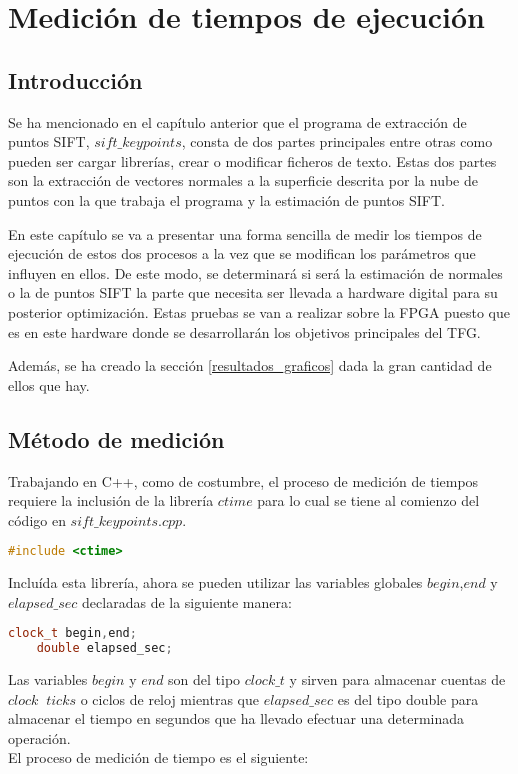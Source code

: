 \chapter{Medición de tiempos de ejecución}

\section{Introducción}
Se ha mencionado en el capítulo anterior que el programa de extracción de puntos SIFT, $sift\_keypoints$, consta de dos partes principales entre otras como pueden ser cargar librerías, crear o modificar ficheros de texto. Estas dos partes son la extracción de vectores normales a la superficie descrita por la nube de puntos con la que trabaja el programa y la estimación de puntos SIFT.


En este capítulo se va a presentar una forma sencilla de medir los tiempos de ejecución de estos dos procesos a la vez que se modifican los parámetros que influyen en ellos. De este modo, se determinará si será la estimación de normales o la de puntos SIFT la parte que necesita ser llevada a hardware digital para su posterior optimización. Estas pruebas se van a realizar sobre la FPGA puesto que es en este hardware donde se desarrollarán los objetivos principales del TFG.

Además, se ha creado la sección \ref{resultados_graficos} dada la gran cantidad de ellos que hay.


\section{Método de medición}
Trabajando en C++, como de costumbre, el proceso de medición de tiempos requiere la inclusión de la librería $ctime$\cite{ctime} para lo cual se tiene al comienzo del código en $sift\_keypoints.cpp$.

\begin{lstlisting}[language=C++,breaklines]
	#include <ctime>
\end{lstlisting}

Incluída esta librería, ahora se pueden utilizar las variables globales $begin$,$end$ y $elapsed\_sec$ declaradas de la siguiente manera:

\begin{lstlisting}[language=C++,breaklines]
	clock_t begin,end;
	double elapsed_sec;
\end{lstlisting}

Las variables $begin$ y $end$ son del tipo $clock\_t$ y sirven para almacenar cuentas de $clock\;\; ticks$ o ciclos de reloj mientras que $elapsed\_sec$ es del tipo double para almacenar el tiempo en segundos que ha llevado efectuar una determinada operación.\\
El proceso de medición de tiempo es el siguiente: 

